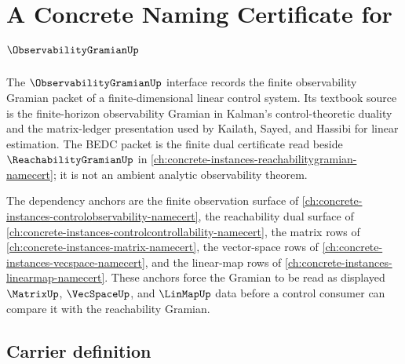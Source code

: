 \chapter{A Concrete Naming Certificate for $\ObservabilityGramianUp$}
\label{ch:concrete-instances-observability-gramian-namecert}

The $\ObservabilityGramianUp$ interface records the finite observability Gramian packet of a finite-dimensional linear control system. Its textbook source is the finite-horizon observability Gramian in Kalman's control-theoretic duality and the matrix-ledger presentation used by Kailath, Sayed, and Hassibi for linear estimation. The BEDC packet is the finite dual certificate read beside $\ReachabilityGramianUp$ in \autoref{ch:concrete-instances-reachabilitygramian-namecert}; it is not an ambient analytic observability theorem.

The dependency anchors are the finite observation surface of \autoref{ch:concrete-instances-controlobservability-namecert}, the reachability dual surface of \autoref{ch:concrete-instances-controlcontrollability-namecert}, the matrix rows of \autoref{ch:concrete-instances-matrix-namecert}, the vector-space rows of \autoref{ch:concrete-instances-vecspace-namecert}, and the linear-map rows of \autoref{ch:concrete-instances-linearmap-namecert}. These anchors force the Gramian to be read as displayed $\MatrixUp$, $\VecSpaceUp$, and $\LinMapUp$ data before a control consumer can compare it with the reachability Gramian.

\section{Carrier definition}
\label{sec:observability-gramian-carrier}

